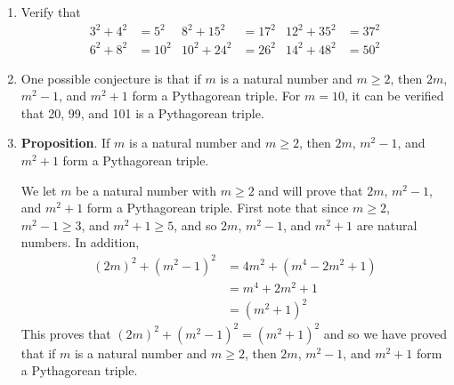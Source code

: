 \documentclass[11pt]{article}
\begin{document}
\begin{enumerate}
  \item Verify that
\begin{align*}
3^2 + 4^2 &= 5^2   &  8^2 + 15^2 &= 17^2  &  12^2 + 35^2 &= 37^2 \\
6^2 + 8^2 &= 10^2  &  10^2 + 24^2 &= 26^2 &  14^2 + 48^2 &= 50^2
\end{align*}

  \item One possible conjecture is that if $m$ is a natural number and $m \geq 2$, then  $2m$, $m^2 - 1$, and $m^2 + 1$ form a Pythagorean triple.  For $m = 10$, it can be verified that 20, 99, and 101 is a Pythagorean triple.
  \item \textbf{Proposition}.  If $m$ is a natural number and $m \geq 2$, then  $2m$, $m^2 - 1$, and $m^2 + 1$ form a Pythagorean triple.
\begin{myproof}
We let $m$ be a natural number with $m \geq 2$ and will prove that $2m$, $m^2 - 1$, and $m^2 + 1$ form a Pythagorean triple.  First note that since $m \geq 2$, $m^2 - 1 \geq 3$, and $m^2 + 1 \geq 5$, and so 
$2m$, $m^2 - 1$, and $m^2 + 1$ are natural numbers.  In addition,
\begin{align*}
\left( 2m \right)^2 + \left( m^2 - 1 \right)^2 &= 4m^2 + \left( m^4 -2m^2 + 1 \right) \\
                                               &= m^4 + 2m^2 + 1 \\
                                               &= \left( m^2 + 1 \right)^2
\end{align*}
This proves that $\left( 2m \right)^2 + \left( m^2 - 1 \right)^2 = \left( m^2 + 1 \right)^2$ and so we have proved that if $m$ is a natural number and $m \geq 2$, then  $2m$, $m^2 - 1$, and $m^2 + 1$ form a Pythagorean triple.
\end{myproof}
\end{enumerate}
\end{document}
